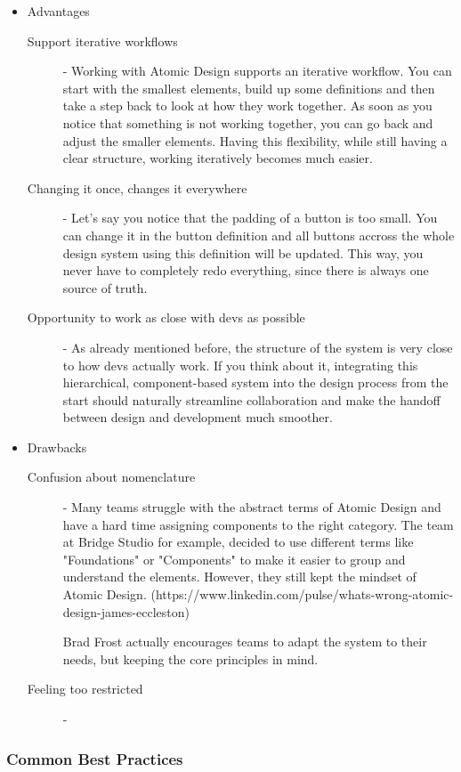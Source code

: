 \begin{itemize}
	\item Advantages
	      \begin{description}
		      \item[Support iterative workflows] - Working with Atomic Design supports an iterative
		            workflow. You can start with the smallest elements, build up some definitions and then
		            take a step back to look at how they work together. As soon as you notice that
		            something is not working together, you can go back and adjust the smaller
		            elements. Having this flexibility, while still having a clear structure, working
		            iteratively becomes much easier. 
		      \item[Changing it once, changes it everywhere] - Let's say you notice that the padding
		            of a button is too small. You can change it in the button definition and all buttons
		            accross the whole design system using this definition will be updated. This way,
		            you never have to completely redo everything, since there is always one source
		            of truth.
		      \item[Opportunity to work as close with devs as possible] - As already mentioned
		            before, the structure of the system is very close to how devs actually work.
		            If you think about it, integrating this hierarchical, component-based system
		            into the design process from the start should naturally streamline collaboration
		            and make the handoff between design and development much smoother.
	      \end{description}
	\item Drawbacks
	      \begin{description}
		      \item[Confusion about nomenclature] - Many teams struggle with the abstract terms of
		      Atomic Design and have a hard time assigning components to the right category. The
		      team at Bridge Studio for example, decided to use different terms like "Foundations"
		      or "Components" to make it easier to group and understand the elements. However, they
		      still kept the mindset of Atomic Design.
		      (https://www.linkedin.com/pulse/whats-wrong-atomic-design-james-eccleston)
			  
			  Brad Frost actually encourages teams to adapt
		      the system to their needs, but keeping the core principles in mind. 
		      \item[Feeling too restricted] - 
	      \end{description}
\end{itemize}

\subsubsection{Common Best Practices}
